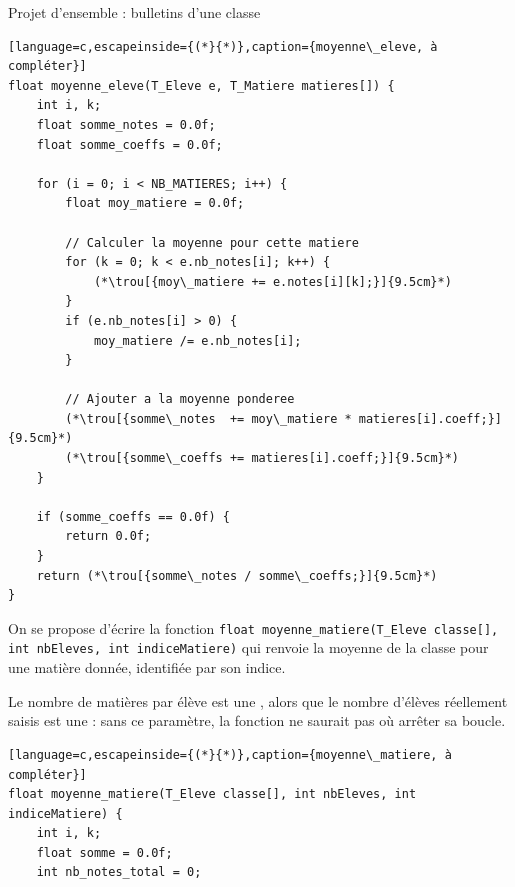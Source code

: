 \begin{UPSTIexercice}{Projet d'ensemble : bulletins d'une classe}

    \begin{lstlisting}[language=c,escapeinside={(*}{*)},caption={moyenne\_eleve, à compléter}]
float moyenne_eleve(T_Eleve e, T_Matiere matieres[]) {
    int i, k;
    float somme_notes = 0.0f;
    float somme_coeffs = 0.0f;

    for (i = 0; i < NB_MATIERES; i++) {
        float moy_matiere = 0.0f;

        // Calculer la moyenne pour cette matiere
        for (k = 0; k < e.nb_notes[i]; k++) {
            (*\trou[{moy\_matiere += e.notes[i][k];}]{9.5cm}*)
        }
        if (e.nb_notes[i] > 0) {
            moy_matiere /= e.nb_notes[i];
        }

        // Ajouter a la moyenne ponderee
        (*\trou[{somme\_notes  += moy\_matiere * matieres[i].coeff;}]{9.5cm}*)
        (*\trou[{somme\_coeffs += matieres[i].coeff;}]{9.5cm}*)
    }

    if (somme_coeffs == 0.0f) {
        return 0.0f;
    }
    return (*\trou[{somme\_notes / somme\_coeffs;}]{9.5cm}*)
}
\end{lstlisting}

    On se propose d'écrire la fonction \texttt{float moyenne\_matiere(T\_Eleve classe[], int nbEleves, int indiceMatiere)} qui renvoie la moyenne de la classe pour une matière donnée, identifiée par son indice.


    Le nombre de matières par élève est une ,
    alors que le nombre d'élèves réellement saisis est une  :
    sans ce paramètre, la fonction ne saurait pas où arrêter sa boucle.


    \begin{lstlisting}[language=c,escapeinside={(*}{*)},caption={moyenne\_matiere, à compléter}]
float moyenne_matiere(T_Eleve classe[], int nbEleves, int indiceMatiere) {
    int i, k;
    float somme = 0.0f;
    int nb_notes_total = 0;


\end{lstlisting}
\end{UPSTIexercice}
